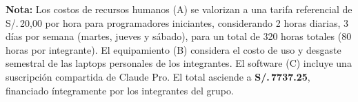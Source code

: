 \begin{supuesto}
\small\textbf{Nota:} Los costos de recursos humanos (A) se valorizan a una tarifa
referencial de S/.\,20,00 por hora para programadores iniciantes, considerando
2 horas diarias, 3 días por semana (martes, jueves y sábado), para un total de
320 horas totales (80 horas por integrante). El equipamiento (B) considera el
costo de uso y desgaste semestral de las laptops personales de los integrantes.
El software (C) incluye una suscripción compartida de Claude Pro. El total
asciende a \textbf{S/.\,\num{7737,25}}, financiado íntegramente por los
integrantes del grupo.
\end{supuesto}
